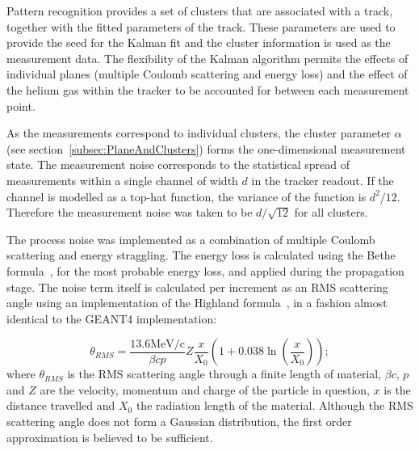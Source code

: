    Pattern recognition provides a set of clusters that are associated with a track, together with the fitted parameters of the track. These parameters are used to provide the seed for the Kalman fit and the cluster information is used as the measurement data. The flexibility of the Kalman algorithm permits the effects of individual planes (multiple Coulomb scattering and energy loss) and the effect of the helium gas within the tracker to be accounted for between each measurement point.
    
    As the measurements correspond to individual clusters, the cluster parameter $\alpha$ (see section~\ref{subsec:PlaneAndClusters}) forms the one-dimensional measurement state. The measurement noise corresponds to the statistical spread of measurements within a single channel of width $d$ in the tracker readout. If the channel is modelled as a top-hat function, the variance of the function is $d^2/12$. Therefore the measurement noise was taken to be $d/\sqrt{12}$ for all clusters.

    The process noise was implemented as a combination of multiple Coulomb scattering and energy straggling. The energy loss is calculated using the Bethe formula~\cite{PDG}, for the most probable energy loss, and applied during the propagation stage. The noise term itself is calculated per increment as an RMS scattering angle using an implementation of the Highland formula~\cite{Highland}, in a fashion almost identical to the GEANT4 implementation:

    \begin{equation}
      \theta_{RMS} = \frac{13.6\textrm{MeV/c}}{\beta c p} Z \frac{x}{X_0}\left( 1 + 0.038 \ln\left(\frac{x}{X_0} \right)\right);
      \label{equ:highland_formula}
    \end{equation}
    where $\theta_{RMS}$ is the RMS scattering angle through a finite length of material, $\beta c$, $p$ and $Z$ are the velocity, momentum and charge of the particle in question, $x$ is the distance travelled and $X_0$ the radiation length of the material. Although the RMS scattering angle does not form a Gaussian distribution, the first order approximation is believed to be sufficient.


